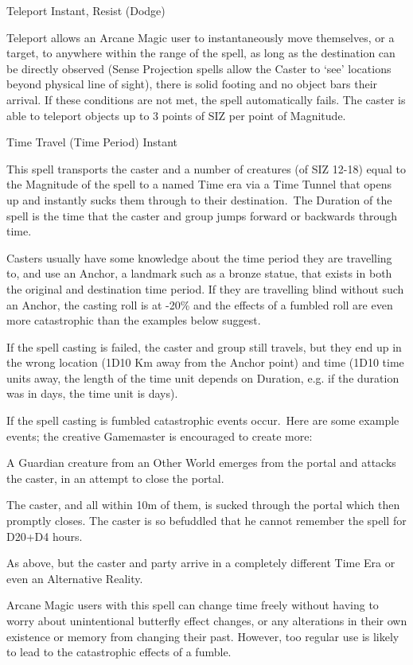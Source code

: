 \begin{rpg-spell}
{Teleport}
{Instant, Resist (Dodge)}

Teleport allows an Arcane Magic user to instantaneously move themselves, or a target, to anywhere within the range of the spell, as long as the destination can be directly observed (Sense Projection spells allow the Caster to ‘see’ locations beyond physical line of sight), there is solid footing and no object bars their arrival. If these conditions are not met, the spell automatically fails. The caster is able to teleport objects up to 3 points of SIZ per point of Magnitude.
\end{rpg-spell}


\begin{rpg-spell}
{Time Travel (Time Period)}
{Instant}

This spell transports the caster and a number of creatures (of SIZ 12-18) equal to the Magnitude of the spell to a named Time era via a Time Tunnel that opens up and instantly sucks them through to their destination. The Duration of the spell is the time that the caster and group jumps forward or backwards through time. 

Casters usually have some knowledge about the time period they are travelling to, and use an Anchor, a landmark such as a bronze statue, that exists in both the original and destination time period. If they are travelling blind without such an Anchor, the casting roll is at -20\% and the effects of a fumbled roll are even more catastrophic than the examples below suggest. 

If the spell casting is failed, the caster and group still travels, but they end up in the wrong location (1D10 Km away from the Anchor point) and time (1D10 time units away, the length of the time unit depends on Duration, e.g. if the duration was in days, the time unit is days).

If the spell casting is fumbled catastrophic events occur. Here are some example events; the creative Gamemaster is encouraged to create more:
\begin{rpg-list}
\item A Guardian creature from an Other World emerges from the portal and attacks the caster, in an attempt to close the portal. 
\item The caster, and all within 10m of them, is sucked through the portal which then promptly closes. The caster is so befuddled that he cannot remember the spell for D20+D4 hours. 
\item As above, but the caster and party arrive in a completely different Time Era or even an Alternative Reality.
\end{rpg-list}

Arcane Magic users with this spell can change time freely without having to worry about unintentional butterfly effect changes, or any alterations in their own existence or memory from changing their past. However, too regular use is likely to lead to the catastrophic effects of a fumble.
\end{rpg-spell}

